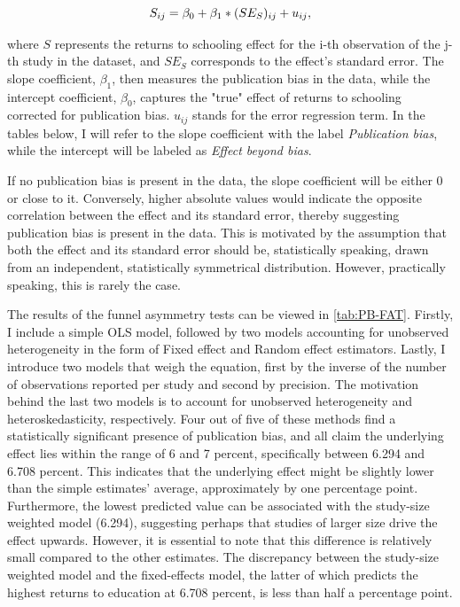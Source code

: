 \begin{equation}\label{eq:fat_reg}
    S_{ij} = \beta_0 + \beta_1 * (SE_{S})_{ij} + u_{ij},
    \vspace{0.3cm}
\end{equation}

where $S$ represents the returns to schooling effect for the i-th observation of the j-th study in the dataset, and $SE_{S}$ corresponds to the effect's standard error. The slope coefficient, $\beta_1$, then measures the publication bias in the data, while the intercept coefficient, $\beta_0$, captures the "true" effect of returns to schooling corrected for publication bias. $u_{ij}$ stands for the error regression term. In the tables below, I will refer to the slope coefficient with the label \textit{Publication bias}, while the intercept will be labeled as \textit{Effect beyond bias}.

If no publication bias is present in the data, the slope coefficient will be either 0 or close to it. Conversely, higher absolute values would indicate the opposite correlation between the effect and its standard error, thereby suggesting publication bias is present in the data. This is motivated by the assumption that both the effect and its standard error should be, statistically speaking, drawn from an independent, statistically symmetrical distribution. However, practically speaking, this is rarely the case. 

The results of the funnel asymmetry tests can be viewed in \autoref{tab:PB-FAT}. Firstly, I include a simple \ac{OLS} model, followed by two models accounting for unobserved heterogeneity in the form of Fixed effect and Random effect estimators. Lastly, I introduce two models that weigh the equation, first by the inverse of the number of observations reported per study and second by precision. The motivation behind the last two models is to account for unobserved heterogeneity and heteroskedasticity, respectively. Four out of five of these methods find a statistically significant presence of publication bias, and all claim the underlying effect lies within the range of 6 and 7 percent, specifically between 6.294 and 6.708 percent. This indicates that the underlying effect might be slightly lower than the simple estimates' average, approximately by one percentage point. Furthermore, the lowest predicted value can be associated with the study-size weighted model (6.294), suggesting perhaps that studies of larger size drive the effect upwards. However, it is essential to note that this difference is relatively small compared to the other estimates. The discrepancy between the study-size weighted model and the fixed-effects model, the latter of which predicts the highest returns to education at 6.708 percent, is less than half a percentage point.

